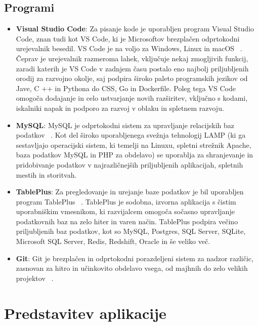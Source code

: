 \documentclass[a4paper, 12pt]{book}
\begin{document}
\section{Programi}
 \begin{itemize}
  \item \textbf{Visual Studio Code}: Za pisanje kode je uporabljen program Visual Studio Code, znan tudi kot VS Code, ki je Microsoftov brezplačen odprtokodni urejevalnik besedil. VS Code je na voljo za Windows, Linux in macOS  ~\cite{VSC}. Čeprav je urejevalnik razmeroma lahek, vključuje nekaj zmogljivih funkcij, zaradi katerih je VS Code v zadnjem času postalo eno najbolj priljubljenih orodij za razvojno okolje, saj podpira široko paleto programskih jezikov od Jave, C ++ in Pythona do CSS, Go in Dockerfile. Poleg tega VS Code omogoča dodajanje in celo ustvarjanje novih razširitev, vključno s kodami, iskalniki napak in podporo za razvoj v oblaku in spletnem razvoju.

 \item \textbf{MySQL}: MySQL je odprtokodni sistem za upravljanje relacijskih baz podatkov ~\cite{MySQL}. Kot del široko uporabljenega svežnja tehnologij LAMP (ki ga sestavljajo operacijski sistem, ki temelji na Linuxu, spletni strežnik Apache, baza podatkov MySQL in PHP za obdelavo) se uporablja za shranjevanje in pridobivanje podatkov v najrazličnejših priljubljenih aplikacijah, spletnih mestih in storitvah.

\item \textbf{TablePlus}: Za pregledovanje in urejanje baze podatkov je bil uporabljen program TablePlus  ~\cite{TablePlus}. TablePlus je sodobna, izvorna aplikacija s čistim uporabniškim vmesnikom, ki razvijalcem omogoča sočasno upravljanje podatkovnih baz na zelo hiter in varen način. TablePlus podpira večino priljubljenih baz podatkov, kot so MySQL, Postgres, SQL Server, SQLite, Microsoft SQL Server, Redis, Redshift, Oracle in še veliko več.

\item \textbf{Git}: Git je brezplačen in odprtokodni porazdeljeni sistem za nadzor različic, zasnovan za hitro in učinkovito obdelavo vsega, od majhnih do zelo velikih projektov ~\cite{Git}.
\end{itemize}

\chapter{Predstavitev aplikacije}
\label{ch3}
\end{document}
